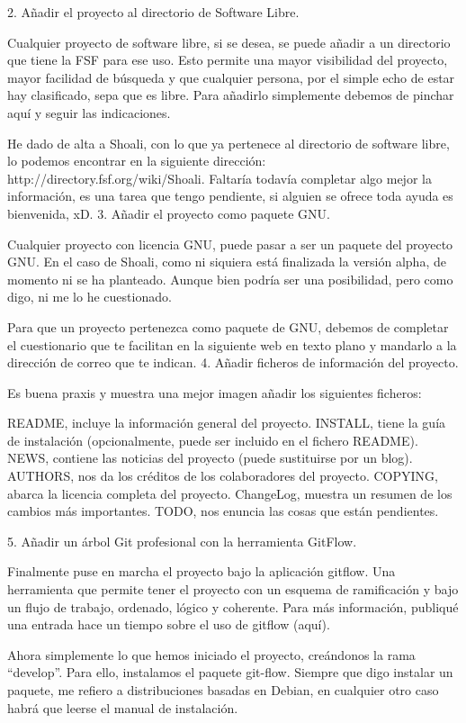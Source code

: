 \documentclass[a4paper, 12pt]{book}
\begin{document}
2. Añadir el proyecto al directorio de Software Libre.

Cualquier proyecto de software libre, si se desea, se puede añadir a un directorio que tiene la FSF para ese uso. Esto permite una mayor visibilidad del proyecto, mayor facilidad de búsqueda y que cualquier persona, por el simple echo de estar hay clasificado, sepa que es libre. Para añadirlo simplemente debemos de pinchar aquí y seguir las indicaciones.

He dado de alta a Shoali, con lo que ya pertenece al directorio de software libre, lo podemos encontrar en la siguiente dirección: http://directory.fsf.org/wiki/Shoali. Faltaría todavía completar algo mejor la información, es una tarea que tengo pendiente, si alguien se ofrece toda ayuda es bienvenida, xD.
3. Añadir el proyecto como paquete GNU.

Cualquier proyecto con licencia GNU, puede pasar a ser un paquete del proyecto GNU. En el caso de Shoali, como ni siquiera está finalizada la versión alpha, de momento ni se ha planteado. Aunque bien podría ser una posibilidad, pero como digo, ni me lo he cuestionado.

Para que un proyecto pertenezca como paquete de GNU, debemos de completar el cuestionario que te facilitan en la siguiente web en texto plano y mandarlo a la dirección de correo que te indican.
4. Añadir ficheros de información del proyecto.

Es buena praxis y muestra una mejor imagen añadir los siguientes ficheros:

    README, incluye la información general del proyecto.
    INSTALL, tiene la guía de instalación (opcionalmente, puede ser incluido en el fichero README).
    NEWS, contiene las noticias del proyecto (puede sustituirse por un blog).
    AUTHORS, nos da los créditos de los colaboradores del proyecto.
    COPYING, abarca la licencia completa del proyecto.
    ChangeLog, muestra un resumen de los cambios más importantes.
    TODO, nos enuncia las cosas que están pendientes.

5. Añadir un árbol Git profesional con la herramienta GitFlow.

Finalmente puse en marcha el proyecto bajo la aplicación gitflow. Una herramienta que permite tener el proyecto con un esquema de ramificación y bajo un flujo de trabajo, ordenado, lógico y coherente. Para más información, publiqué una entrada hace un tiempo sobre el uso de gitflow (aquí).

Ahora simplemente lo que hemos iniciado el proyecto, creándonos la rama “develop”. Para ello, instalamos el paquete git-flow. Siempre que digo instalar un paquete, me refiero a distribuciones basadas en Debian, en cualquier otro caso habrá que leerse el manual de instalación.
\end{document}
